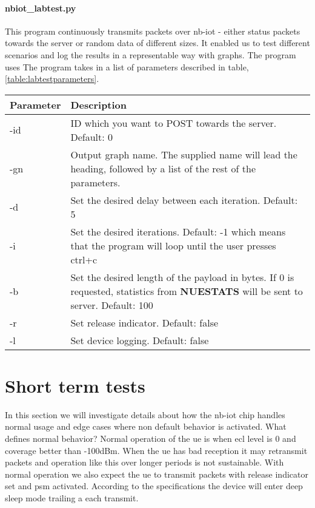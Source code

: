 \documentclass[USenglish]{ifimaster}  %
\begin{document}
\paragraph{\textbf{nbiot\_labtest.py}}
This program continuously transmits packets over \acrshort{nb-iot} - either status packets towards the server or random data of different sizes. It enabled us to test different scenarios and log the results in a representable way with graphs. The program uses The program takes in a list of parameters described in table, \vref{table:labtestparameters}.

\begin{center} \label{table:labtestparameters}
  \begin{tabular}{ | l | m{10cm} | }
    \hline
    Parameter & Description \\
    \hline
    -id & ID which you want to POST towards the server. Default: 0 \\
    \hline
    -gn & Output graph name. The supplied name will lead the heading, followed by a list of the rest of the parameters. \\
    \hline
    -d & Set the desired delay between each iteration. Default: 5 \\
    \hline
    -i & Set the desired iterations. Default: -1 which means that the program will loop until the user presses ctrl+c \\
    \hline
    -b & Set the desired length of the payload in bytes. If 0 is requested, statistics from \textbf{NUESTATS} will be sent to server. Default: 100 \\
    \hline
    -r & Set release indicator. Default: false \\
    \hline
    -l & Set device logging. Default: false \\
    \hline
  \end{tabular}
\end{center}

\section{Short term tests} \label{section:detailedtest}
In this section we will investigate details about how the \acrshort{nb-iot} chip handles normal usage and edge cases where non default behavior is activated. What defines normal behavior? Normal operation of the \acrshort{ue} is when \acrshort{ecl} level is 0 and coverage better than -100dBm. When the \acrshort{ue} has bad reception it may retransmit packets and operation like this over longer periods is not sustainable. With normal operation we also expect the \acrshort{ue} to transmit packets with release indicator set and \acrshort{psm} activated. According to the specifications the device will enter deep sleep mode trailing a each transmit.
\end{document}
